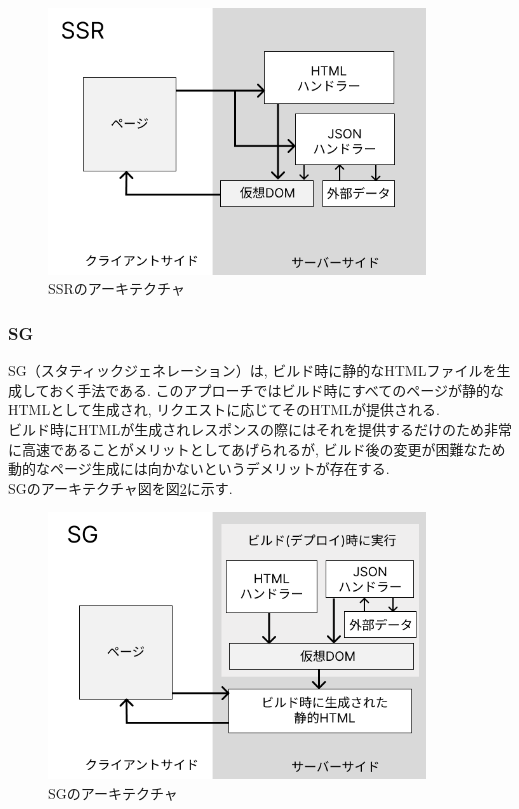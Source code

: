 \begin{figure}[htbp]
	\begin{center}
		\includegraphics[width=100mm]{./images/SSR.png}
		\caption{SSRのアーキテクチャ}\label{fig:SSR-image}
	\end{center}
\end{figure}
\subsubsection{SG}
SG（スタティックジェネレーション）は, ビルド時に静的なHTMLファイルを生成しておく手法である.
このアプローチではビルド時にすべてのページが静的なHTMLとして生成され, リクエストに応じてそのHTMLが提供される.\\
ビルド時にHTMLが生成されレスポンスの際にはそれを提供するだけのため非常に高速であることがメリットとしてあげられるが, ビルド後の変更が困難なため動的なページ生成には向かないというデメリットが存在する.\\
SGのアーキテクチャ図を図\ref{fig:SG-image}に示す.

\begin{figure}[htbp]
	\begin{center}
		\includegraphics[width=100mm]{./images/SG.png}
		\caption{SGのアーキテクチャ}\label{fig:SG-image}
	\end{center}
\end{figure}

